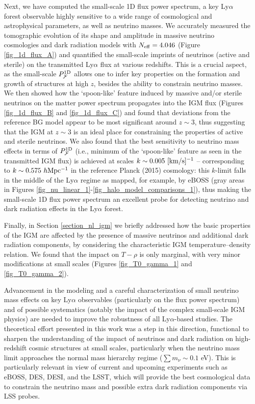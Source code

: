 \documentclass{emulateapj}
\begin{document}
Next, we have computed the small-scale 1D flux power spectrum,
a key Ly$\alpha$ forest observable
highly sensitive to  a wide range of cosmological and astrophysical parameters, as well as neutrino masses.
We accurately measured the tomographic evolution of its shape and amplitude  
in massive neutrino cosmologies and 
dark radiation models with $N_{\rm eff}=4.046$  (Figure \ref{fig_1d_flux_A})
and quantified the small-scale imprints of neutrinos (active and sterile) on the transmitted Ly$\alpha$ flux at various redshifts. 
This is a crucial aspect, as the small-scale $P^{\rm 1D}_{{\cal{F}}}$ allows one to 
infer key properties on the formation and growth of structures at high $z$, 
besides the ability to constrain neutrino masses.
We then showed how the `spoon-like' feature induced by massive and/or sterile neutrinos on the matter power spectrum propagates into the 
IGM flux (Figures \ref{fig_1d_flux_B} and \ref{fig_1d_flux_C}) and found
that  deviations from the reference BG model appear to be most significant around $z \sim 3$,
thus suggesting that the
IGM at $z \sim 3$ is an ideal place for constraining the properties of  active and sterile neutrinos. 
We also found that  the best sensitivity to neutrino mass effects in terms of $P^{\rm 1D}_{{\cal{F}}}$ 
(i.e., minimum of the `spoon-like'  feature as seen in the transmitted IGM flux)
is achieved at scales $k \sim 0.005~{\rm [km/s]^{-1}}$ -- corresponding to  $k \sim 0.575~h{\rm Mpc^{-1}}$  in
the reference Planck (2015) cosmology: this $k$-limit falls
in the middle of the Ly$\alpha$ regime as mapped, for example, by eBOSS (gray areas in Figures \ref{fig_nu_linear_1}-\ref{fig_halo_model_comparisons_1}), 
thus making the small-scale 1D flux power spectrum an excellent probe for detecting
neutrino and dark radiation effects in the Ly$\alpha$ forest. 

Finally,  in Section \ref{section_nl_igm} we briefly addressed 
how  the basic properties of the IGM are
affected by the presence of massive neutrinos
and additional dark radiation components, by considering 
the characteristic IGM temperature--density relation. We found that  the impact 
on $T-\rho$ is only marginal, with very
minor modifications at small scales (Figures \ref{fig_T0_gamma_1} and \ref{fig_T0_gamma_2}). 

Advancement in the modeling and a careful characterization of small neutrino mass effects on key Ly$\alpha$ observables (particularly on the flux power spectrum) 
and of possible systematics (notably the impact of the complex small-scale IGM physics) are needed to improve the robustness of all Ly$\alpha$-based studies.
The theoretical effort presented in this work was a step in this direction,  
functional to sharpen the understanding of the impact of neutrinos and dark radiation on high-redshift 
cosmic structures at small scales, particularly when the neutrino mass limit
approaches the normal mass hierarchy regime ($\sum m_{\nu} \sim 0.1$ eV).
This is particularly relevant in view of 
current and upcoming experiments such as eBOSS, DES, DESI, and the LSST, 
which will provide the best cosmological data to constrain the neutrino mass and possible extra dark radiation components
via LSS probes. 
\end{document}

